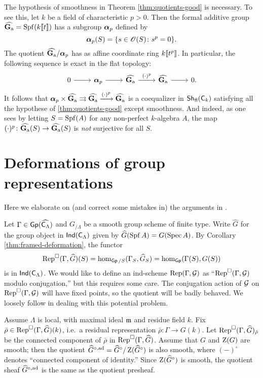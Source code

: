 \begin{example}
The hypothesis of smoothness in Theorem \ref{thm:quotients-good} is necessary. 
To see this, let $k$ be a field of characteristic $p>0$. Then the formal 
additive group $\widehat{\mathbf{G}_\mathrm{a}}=\operatorname{Spf}(k\llbracket t \rrbracket)$ has a subgroup ${\boldsymbol\alpha}_p$ defined 
by 
\[
  {\boldsymbol\alpha}_p(S) = \{s\in \mathscr{O}(S)\colon s^p=0\} .
\]
The quotient $\widehat{\mathbf{G}_\mathrm{a}}/{\boldsymbol\alpha}_p$ has as affine coordinate ring 
$k\llbracket t^p \rrbracket$. In particular, the following sequence is exact in the flat 
topology:
\[
\begin{tikzcd}
	0 \ar[r]
		& \balpha_p \ar[r]
		& \widehat\Ga \ar[r, "(\cdot)^p"]
		& \widehat\Ga \ar[r]
		& 0 .
\end{tikzcd}
\]
It follows that 
${\boldsymbol\alpha}_p\times \widehat{\mathbf{G}_\mathrm{a}}\rightrightarrows\widehat{\mathbf{G}_\mathrm{a}}\xrightarrow{(\cdot)^p} \widehat{\mathbf{G}_\mathrm{a}}$
is a coequalizer in $\operatorname{\mathsf{Sh}}_{\mathrm{fl}}(\mathsf{C}_k)$ satisfying all the hypothese 
of \ref{thm:quotients-good} except smoothness. And indeed, as one sees by 
letting $S=\operatorname{Spf}(A)$ for any non-perfect $k$-algebra $A$, the map 
$(\cdot)^p\colon \widehat{\mathbf{G}_\mathrm{a}}(S)\to \widehat{\mathbf{G}_\mathrm{a}}(S)$ is \emph{not} surjective for 
all $S$. 
\end{example}





\section{Deformations of group representations}

Here we elaborate on (and correct some mistakes in) the arguments in 
\cite[\S 2.1]{bockle-2013}. 

Let $\Gamma\in \operatorname{\mathsf{Gp}}(\widehat{\mathsf{C}_\Lambda})$ and $G_{/\Lambda}$ be a smooth 
group scheme of finite type. Write $\widehat G$ for the group object in 
$\operatorname{\mathsf{Ind}}(\mathsf{C}_\Lambda)$ given by $\widehat G(\operatorname{Spf} A) = G(\operatorname{Spec} A)$. By 
Corollary \ref{thm:framed-deformation}, the functor 
\[
  \operatorname{Rep}^\square(\Gamma,\widehat G)(S) = \hom_{\operatorname{\mathsf{Gp}}/S}(\Gamma_S,\widehat G_S) = \hom_{\operatorname{\mathsf{Gp}}}(\Gamma(S), G(S)) 
\]
is in $\operatorname{\mathsf{Ind}}(\mathsf{C}_\Lambda)$. We would like to define an ind-scheme 
$\operatorname{Rep}(\Gamma,\mathcal{G})$ as ``$\operatorname{Rep}^\square(\Gamma,\mathcal{G})$ modulo conjugation,'' but 
this requires some care. The conjugation action of $\mathcal{G}$ on 
$\operatorname{Rep}^\square(\Gamma,\mathcal{G})$ will have fixed points, so the quotient will be 
badly behaved. We loosely follow \cite[Ch.~2--3]{tilouine-1996} in dealing with 
this potential problem. 

Assume $\Lambda$ is local, with maximal ideal $\mathfrak{m}$ and residue field $k$. 
Fix $\bar\rho\in \operatorname{Rep}^\square(\Gamma,\widehat G)(k)$, i.e.~a residual 
representation $\bar\rho\colon \Gamma\to G(k)$. Let 
$\operatorname{Rep}^\square(\Gamma,\widehat G)_{\bar\rho}$ be the connected component of 
$\bar\rho$ in $\operatorname{Rep}^\square(\Gamma,\widehat G)$. Assume 
that $G$ and $\operatorname{Z}(G)$ are smooth; then the quotient 
$\widehat{G}^{\circ,\mathrm{ad}}=\widehat G^\circ/\operatorname{Z}(\widehat G^\circ)$ is also 
smooth, where $(-)^\circ$ denotes ``connected component of identity.'' 
Since $\operatorname{Z}(\widehat G^\circ)$ is smooth, the quotient sheaf 
$\widehat G^{\circ,\mathrm{ad}}$ is the same as the quotient presheaf. 

